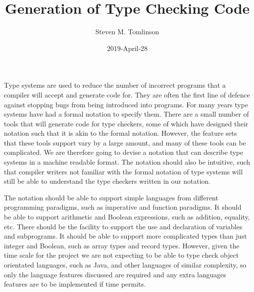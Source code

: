 \documentclass{UoYCSproject}
\author{Steven M. Tomlinson}
\title{Generation of Type Checking Code}
\date{2019-April-28}
\begin{document}
  \maketitle
  \renewcommand*{\lstlistlistingname}{List of Listings}
  \lstlistoflistings

  \listoffigures

  \begin{summary}
    Type systems are used to reduce the number of incorrect programs that a compiler will accept and generate code for.
    They are often the first line of defence against stopping bugs from being introduced into programs.
    For many years type systems have had a formal notation to specify them.
    There are a small number of tools that will generate code for type checkers, some of which have designed their notation such that it is akin to the formal notation.
    However, the feature sets that these tools support vary by a large amount, and many of these tools can be complicated.
    We are therefore going to devise a notation that can describe type systems in a machine readable format.
    The notation should also be intuitive, such that compiler writers not familiar with the formal notation of type systems will still be able to understand the type checkers written in our notation.
  
    The notation should be able to support simple languages from different programming paradigms, such as imperative and function paradigms.
    It should be able to support arithmetic and Boolean expressions, such as addition, equality, etc.
    There should be the facility to support the use and declaration of variables and subprograms.
    It should be able to support more complicated types than just integer and Boolean, such as array types and record types.
    However, given the time scale for the project we are not expecting to be able to type check object orientated languages, such as Java,  and other languages of similar complexity, so only the language features discussed are required and any extra languages features are to be implemented if time permits.
    

\end{summary}
\end{document}
